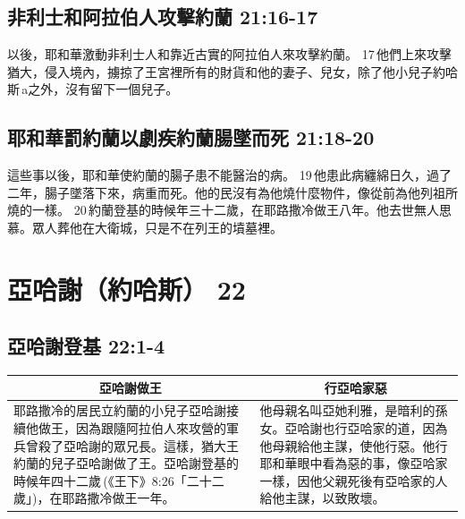 \subsection{非利士和阿拉伯人攻擊約蘭 21:16-17}
以後，耶和華激動非利士人和靠近古實的阿拉伯人來攻擊約蘭。 17 他們上來攻擊猶大，侵入境內，擄掠了王宮裡所有的財貨和他的妻子、兒女，除了他小兒子約哈斯 a之外，沒有留下一個兒子。

\subsection{耶和華罰約蘭以劇疾約蘭腸墜而死 21:18-20}
這些事以後，耶和華使約蘭的腸子患不能醫治的病。 19 他患此病纏綿日久，過了二年，腸子墜落下來，病重而死。他的民沒有為他燒什麼物件，像從前為他列祖所燒的一樣。 20 約蘭登基的時候年三十二歲，在耶路撒冷做王八年。他去世無人思慕。眾人葬他在大衛城，只是不在列王的墳墓裡。

\section{亞哈謝（約哈斯） 22 }
\subsection{亞哈謝登基 22:1-4}
\begin{table}[H]
\centering 
\begin{tabular}{p{9.1cm}|p{}}\hline\hline
\multicolumn{1}{c|}{亞哈謝做王}&\multicolumn{1}{c}{行亞哈家惡}\\\hline\hline
耶路撒冷的居民立約蘭的小兒子亞哈謝接續他做王，因為跟隨阿拉伯人來攻營的軍兵曾殺了亞哈謝的眾兄長。這樣，猶大王約蘭的兒子亞哈謝做了王。亞哈謝登基的時候年四十二歲 (《王下》8:26「二十二歲」)，在耶路撒冷做王一年。
&他母親名叫亞她利雅，是暗利的孫女。亞哈謝也行亞哈家的道，因為他母親給他主謀，使他行惡。他行耶和華眼中看為惡的事，像亞哈家一樣，因他父親死後有亞哈家的人給他主謀，以致敗壞。 \\\hline
\end{tabular}
\end{table}


